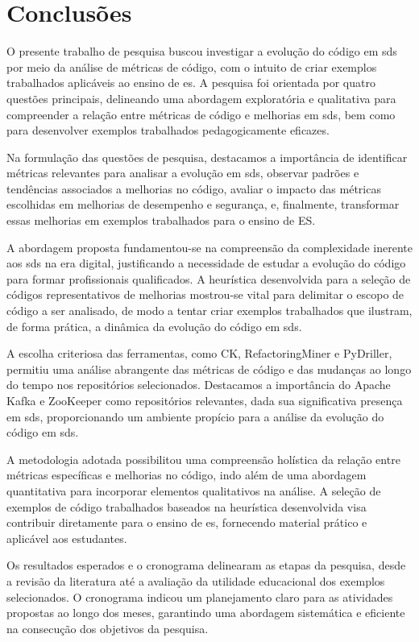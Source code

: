 \chapter{Conclusões}
\label{chapter:conclusions}

O presente trabalho de pesquisa buscou investigar a evolução do código em \gls{sds} por meio da análise de métricas de código, com o intuito de criar exemplos trabalhados aplicáveis ao ensino de \gls{es}. A pesquisa foi orientada por quatro questões principais, delineando uma abordagem exploratória e qualitativa para compreender a relação entre métricas de código e melhorias em \gls{sds}, bem como para desenvolver exemplos trabalhados pedagogicamente eficazes.

Na formulação das questões de pesquisa, destacamos a importância de identificar métricas relevantes para analisar a evolução em \gls{sds}, observar padrões e tendências associados a melhorias no código, avaliar o impacto das métricas escolhidas em melhorias de desempenho e segurança, e, finalmente, transformar essas melhorias em exemplos trabalhados para o ensino de ES.

A abordagem proposta fundamentou-se na compreensão da complexidade inerente aos \gls{sds} na era digital, justificando a necessidade de estudar a evolução do código para formar profissionais qualificados. A heurística desenvolvida para a seleção de códigos representativos de melhorias mostrou-se vital para delimitar o escopo de código a ser analisado, de modo a tentar criar exemplos trabalhados que ilustram, de forma prática, a dinâmica da evolução do código em \gls{sds}.

A escolha criteriosa das ferramentas, como CK, RefactoringMiner e PyDriller, permitiu uma análise abrangente das métricas de código e das mudanças ao longo do tempo nos repositórios selecionados. Destacamos a importância do Apache Kafka e ZooKeeper como repositórios relevantes, dada sua significativa presença em \gls{sds}, proporcionando um ambiente propício para a análise da evolução do código em \gls{sds}.

A metodologia adotada possibilitou uma compreensão holística da relação entre métricas específicas e melhorias no código, indo além de uma abordagem quantitativa para incorporar elementos qualitativos na análise. A seleção de exemplos de código trabalhados baseados na heurística desenvolvida visa contribuir diretamente para o ensino de \gls{es}, fornecendo material prático e aplicável aos estudantes.

Os resultados esperados e o cronograma delinearam as etapas da pesquisa, desde a revisão da literatura até a avaliação da utilidade educacional dos exemplos selecionados. O cronograma indicou um planejamento claro para as atividades propostas ao longo dos meses, garantindo uma abordagem sistemática e eficiente na consecução dos objetivos da pesquisa.

